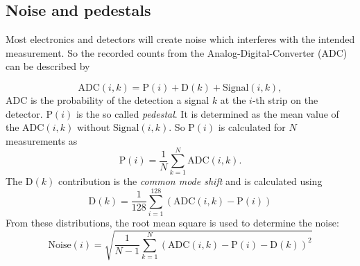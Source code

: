 \subsection{Noise and pedestals}
Most electronics and detectors will create noise which interferes with the intended measurement. So the recorded counts from the Analog-Digital-Converter (ADC) can be described by

\begin{equation*}
	\mathrm{ADC}(i,k) = \mathrm{P}(i) + \mathrm{D}(k) + \mathrm{Signal}(i,k),
\end{equation*}
ADC is the probability of the detection a signal $k$ at the $i$-th strip on the detector. $\mathrm{P}(i)$ is the so called \textit{pedestal}. It is determined as the mean value of the $\mathrm{ADC}(i,k)$ without $\mathrm{Signal}(i,k)$. So $\mathrm{P}(i)$ is calculated for $N$ measurements as 
\begin{equation}
	\mathrm{P}(i) = \frac{1}{N} \sum_{k=1}^{N}\mathrm{ADC}(i,k).
	\label{eq:pedestal}
\end{equation}
The $\mathrm{D}(k)$ contribution is the \textit{common mode shift} and is calculated using 
\begin{equation}
	\mathrm{D}(k) = \frac{1}{128}\sum_{i=1}^{128}(\mathrm{ADC}(i,k) - \mathrm{P}(i))
	\label{eq:common_mode}
\end{equation}
From these distributions, the root mean square is used to determine the noise:
\begin{equation}
	\mathrm{Noise}(i)=\sqrt{\frac{1}{N-1}\sum_{k=1}^{N}(\mathrm{ADC}(i,k) - \mathrm{P}(i) - \mathrm{D}(k))^2}
	\label{eq:noise}
\end{equation}